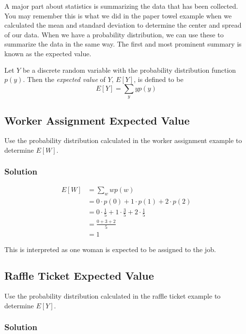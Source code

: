 \documentclass[11pt]{article}
\theoremstyle{definition}
\begin{document}
A major part about statistics is summarizing the data that has been collected. You may remember this is what we did in the paper towel example when we calculated the mean and standard deviation to determine the center and spread of our data. When we have a probability distribution, we can use these to summarize the data in the same way. The first and most prominent summary is known as the expected value.

\begin{shaded}
	Let $Y$ be a discrete random variable with the probability distribution function $p(y)$. Then the \textit{expected value} of $Y$, $E[Y]$, is defined to be
	$$
		E[Y] = \sum_y yp(y)
	$$
\end{shaded}

\subsection{Worker Assignment Expected Value}

Use the probability distribution calculated in the worker assignment example to determine $E[W]$.

\subsubsection*{Solution}

$$
	\begin{aligned}
		E[W] & = \sum_w wp(w) \\
		& = 0 \cdot p(0) + 1 \cdot p(1) + 2 \cdot p(2) \\
		& = 0 \cdot \frac{1}{5} + 1 \cdot \frac{3}{5} + 2 \cdot \frac{1}{5} \\
		& = \frac{0 + 3 + 2}{5} \\
		& = 1
	\end{aligned}
$$

This is interpreted as one woman is expected to be assigned to the job.

\subsection{Raffle Ticket Expected Value}

Use the probability distribution calculated in the raffle ticket example to determine $E[Y]$.

\subsubsection*{Solution}
\end{document}
